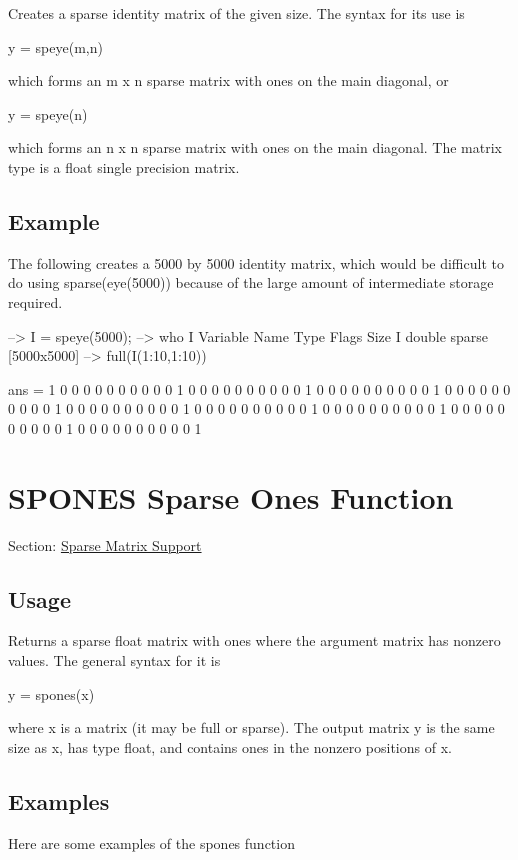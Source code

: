 Creates a sparse identity matrix of the given size. The syntax for its use is \begin{DoxyVerb}  y = speye(m,n)
\end{DoxyVerb}
 which forms an {\ttfamily m x n} sparse matrix with ones on the main diagonal, or \begin{DoxyVerb}  y = speye(n)
\end{DoxyVerb}
 which forms an {\ttfamily n x n} sparse matrix with ones on the main diagonal. The matrix type is a {\ttfamily float} single precision matrix. \hypertarget{variables_struct_Example}{}\subsection{Example}\label{variables_struct_Example}
The following creates a 5000 by 5000 identity matrix, which would be difficult to do using {\ttfamily sparse(eye(5000))} because of the large amount of intermediate storage required.


\begin{DoxyVerbInclude}
--> I = speye(5000);
--> who I
  Variable Name       Type   Flags             Size
              I    double   sparse           [5000x5000]
--> full(I(1:10,1:10))

ans = 
 1 0 0 0 0 0 0 0 0 0 
 0 1 0 0 0 0 0 0 0 0 
 0 0 1 0 0 0 0 0 0 0 
 0 0 0 1 0 0 0 0 0 0 
 0 0 0 0 1 0 0 0 0 0 
 0 0 0 0 0 1 0 0 0 0 
 0 0 0 0 0 0 1 0 0 0 
 0 0 0 0 0 0 0 1 0 0 
 0 0 0 0 0 0 0 0 1 0 
 0 0 0 0 0 0 0 0 0 1 
\end{DoxyVerbInclude}
 \hypertarget{sparse_spones}{}\section{S\-P\-O\-N\-E\-S Sparse Ones Function}\label{sparse_spones}
Section\-: \hyperlink{sec_sparse}{Sparse Matrix Support} \hypertarget{vtkwidgets_vtkxyplotwidget_Usage}{}\subsection{Usage}\label{vtkwidgets_vtkxyplotwidget_Usage}
Returns a sparse {\ttfamily float} matrix with ones where the argument matrix has nonzero values. The general syntax for it is \begin{DoxyVerb}  y = spones(x)
\end{DoxyVerb}
 where {\ttfamily x} is a matrix (it may be full or sparse). The output matrix {\ttfamily y} is the same size as {\ttfamily x}, has type {\ttfamily float}, and contains ones in the nonzero positions of {\ttfamily x}. \hypertarget{variables_matrix_Examples}{}\subsection{Examples}\label{variables_matrix_Examples}
Here are some examples of the {\ttfamily spones} function


